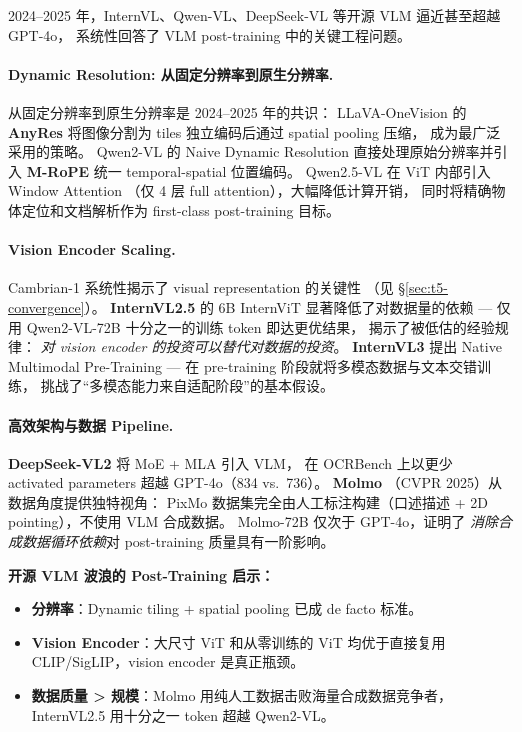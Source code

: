 2024--2025 年，InternVL、Qwen-VL、DeepSeek-VL 等开源 VLM 逼近甚至超越 GPT-4o，
系统性回答了 VLM post-training 中的关键工程问题。

\paragraph{Dynamic Resolution: 从固定分辨率到原生分辨率.}
从固定分辨率到原生分辨率是 2024--2025 年的共识：
LLaVA-OneVision \cite{li2024llava-onevision} 的 \textbf{AnyRes}
将图像分割为 tiles 独立编码后通过 spatial pooling 压缩，
成为最广泛采用的策略。
Qwen2-VL \cite{wang2024qwen2vl} 的 Naive Dynamic Resolution
直接处理原始分辨率并引入 \textbf{M-RoPE}
统一 temporal-spatial 位置编码。
Qwen2.5-VL \cite{bai2025qwen25vl} 在 ViT 内部引入 Window Attention
（仅 4 层 full attention），大幅降低计算开销，
同时将精确物体定位和文档解析作为 first-class post-training 目标。

\paragraph{Vision Encoder Scaling.}
Cambrian-1 \cite{tong2024cambrian} 系统性揭示了 visual representation 的关键性
（见 \S\ref{sec:t5-convergence}）。
\textbf{InternVL2.5} \cite{chen2024internvl25} 的 6B InternViT 显著降低了对数据量的依赖 ---
仅用 Qwen2-VL-72B 十分之一的训练 token 即达更优结果，
揭示了被低估的经验规律：
\textit{对 vision encoder 的投资可以替代对数据的投资}。
\textbf{InternVL3} \cite{zhu2025internvl3} 提出 Native Multimodal Pre-Training ---
在 pre-training 阶段就将多模态数据与文本交错训练，
挑战了``多模态能力来自适配阶段''的基本假设。

\paragraph{高效架构与数据 Pipeline.}
\textbf{DeepSeek-VL2} \cite{wu2024deepseekvl2} 将 MoE + MLA 引入 VLM，
在 OCRBench 上以更少 activated parameters 超越 GPT-4o（834 vs.\ 736）。
\textbf{Molmo} \cite{deitke2024molmo}（CVPR 2025）从数据角度提供独特视角：
PixMo 数据集完全由人工标注构建（口述描述 + 2D pointing），不使用 VLM 合成数据。
Molmo-72B 仅次于 GPT-4o，证明了
\textit{消除合成数据循环依赖}对 post-training 质量具有一阶影响。

\begin{solutionbox}
\textbf{开源 VLM 波浪的 Post-Training 启示：}
\begin{itemize}[leftmargin=2em]
  \item \textbf{分辨率}：Dynamic tiling + spatial pooling 已成 de facto 标准。
  \item \textbf{Vision Encoder}：大尺寸 ViT 和从零训练的 ViT
    均优于直接复用 CLIP/SigLIP，vision encoder 是真正瓶颈。
  \item \textbf{数据质量 > 规模}：Molmo 用纯人工数据击败海量合成数据竞争者，
    InternVL2.5 用十分之一 token 超越 Qwen2-VL。
\end{itemize}
\end{solutionbox}

